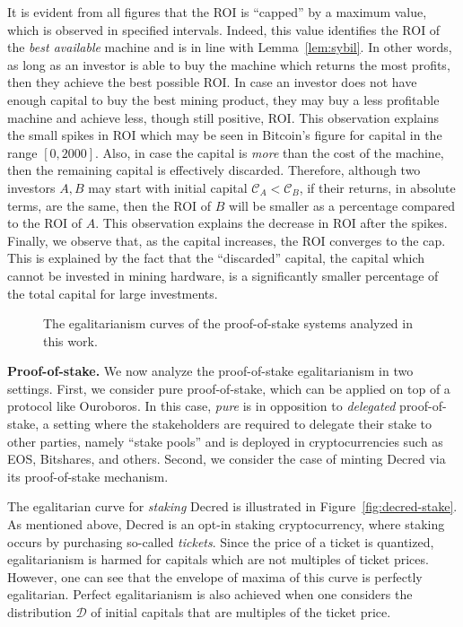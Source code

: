 It is evident from all figures that the ROI is ``capped'' by a maximum value,
which is observed in specified intervals. Indeed, this value identifies the
ROI of the \emph{best available} machine and is in line with Lemma~\ref{lem:sybil}. In other words, as long as an
investor is able to buy the machine which returns the most profits, then they
achieve the best possible ROI. In case an investor does not have enough capital
to buy the best mining product, they may buy a less profitable machine and
achieve less, though still positive, ROI. This observation explains the small
spikes in ROI which may be seen \eg in Bitcoin's figure for capital in the
range $[0, 2000]$. Also, in case the capital is \emph{more} than the cost of
the machine, then the remaining capital is effectively discarded. Therefore,
although two investors $A, B$ may start with initial capital $\mathcal{C}_A <
\mathcal{C}_B$, if their returns, in absolute terms, are the same, then the ROI
of $B$ will be smaller as a percentage compared to the ROI of $A$. This
observation explains the decrease in ROI after the spikes. Finally, we observe
that, as the capital increases, the ROI converges to the cap. This is
explained by the fact that the ``discarded'' capital, \ie the capital which
cannot be invested in mining hardware, is a significantly smaller percentage of
the total capital for large investments.

\begin{figure}
  \caption{The egalitarianism curves of the proof-of-stake systems analyzed in this work.}
  \label{fig:egalitarian_curves_pos}
\end{figure}

\noindent\textbf{Proof-of-stake.}
\noindent
We now analyze the proof-of-stake egalitarianism in two settings. First, we
consider pure proof-of-stake, which can be applied on top of a protocol like
Ouroboros. In this case, \emph{pure} is in opposition to \emph{delegated}
proof-of-stake, a setting where the stakeholders are required to delegate their
stake to other parties, namely ``stake pools'' and is deployed in
cryptocurrencies such as EOS, Bitshares, and others. Second, we consider the
case of minting Decred via its proof-of-stake mechanism.

The egalitarian curve for \emph{staking} Decred is illustrated in
Figure~\ref{fig:decred-stake}.
As mentioned above, Decred is an opt-in staking cryptocurrency, where staking
occurs by purchasing so-called \emph{tickets}. Since the price of a ticket is
quantized, egalitarianism is harmed for capitals which are not multiples of
ticket prices. However, one can see that the envelope of maxima of this curve
is perfectly egalitarian. Perfect egalitarianism is also achieved when one
considers the distribution $\mathcal{D}$ of initial capitals that are multiples
of the ticket price.

